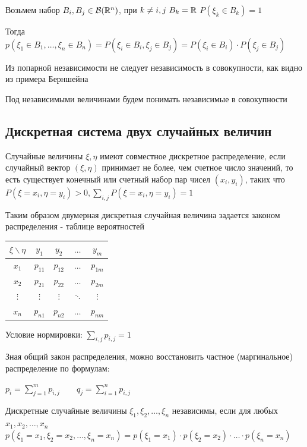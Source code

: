 \documentclass[12pt]{article}
\begin{document}
    Возьмем набор $B_i, B_j \in \mathcal{B}(\mathbb{R}^n)$, при $k \neq i, j \ B_k = \mathbb{R}$ \hfill $P(\xi_k \in B_k) = 1$

    Тогда $p(\xi_1 \in B_1, \dots, \xi_n \in B_n) = P(\xi_i \in B_i, \xi_j \in B_j) = P(\xi_i \in B_i) \cdot P(\xi_j \in B_j)$

    \Nota Из попарной независимости не следует независимость в совокупности, как видно из примера Берншейна

    Под независимыми величинами будем понимать независимые в совокупности

    \subsection{Дискретная система двух случайных величин}

    \Def Случайные величины $\xi, \eta$ имеют совместное дискретное распределение, если случайный вектор $(\xi, \eta)$
    принимает не более, чем счетное число значений, то есть существует конечный или счетный набор пар чисел $(x_i, y_i)$, 
    таких что $P(\xi = x_i, \eta = y_i) > 0, \sum_{i, j} P(\xi = x_i, \eta = y_i) = 1$

    Таким образом двумерная дискретная случайная величина задается законом распределения - таблице вероятностей

    \begin{tabular}{c|c|c|c|c}
        $\xi \backslash \eta$ & $y_1$ & $y_2$ & $\dots$ & $y_m$ \\
        \hline
        $x_1$ & $p_{11}$ & $p_{12}$ & $\dots$ & $p_{1m}$ \\
        \hline
        $x_2$ & $p_{21}$ & $p_{22}$ & $\dots$ & $p_{2m}$ \\
        \hline
        $\vdots$ & $\vdots$ & $\vdots$ & $\ddots$ & $\vdots$ \\
        \hline
        $x_n$ & $p_{n1}$ & $p_{n2}$ & $\dots$ & $p_{nm}$ \\
    \end{tabular}

    Условие нормировки: $\sum_{i, j} p_{i, j} = 1$

    Зная общий закон распределения, можно восстановить частное (маргинальное) распределение по формулам: 

    $p_i = \sum_{j = 1}^m p_{i, j} \qquad q_j = \sum_{i = 1}^n p_{i, j}$

    \Def Дискретные случайные величины $\xi_1, \xi_2, \dots, \xi_n$ независимы, если для любых $x_1, x_2, \dots, x_n$ 
    $p(\xi_1 = x_1, \xi_2 = x_2, \dots, \xi_n = x_n) = p(\xi_1 = x_1) \cdot p(\xi_2 = x_2) \cdot \dots \cdot p(\xi_n = x_n)$
\end{document}
